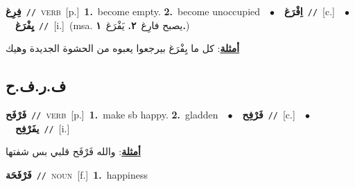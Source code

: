 \documentclass[10pt,a4paper,twoside]{article} %
\begin{document}
\begin{multicols}{2}
{\setlength\topsep{0pt}\textbf{\foreignlanguage{arabic}{فِرِغ}}\ {\color{gray}\texttt{//}\color{black}}\ \textsc{verb}\ [p.]\ \textbf{1.}~become empty.  \textbf{2.}~become unoccupied\ \ $\bullet$\ \ \setlength\topsep{0pt}\textbf{\foreignlanguage{arabic}{اِفْرَغ}}\ {\color{gray}\texttt{//}\color{black}}\ [c.]\ \ $\bullet$\ \ \setlength\topsep{0pt}\textbf{\foreignlanguage{arabic}{يِفْرَغ}}\ {\color{gray}\texttt{//}\color{black}}\ [i.]\ \color{gray}(msa. \foreignlanguage{arabic}{يصبح فارِغ}~\foreignlanguage{arabic}{\textbf{٢.}}  \foreignlanguage{arabic}{يَفْرَغ}~\foreignlanguage{arabic}{\textbf{١.}})\color{black}\  \begin{flushright}\color{gray}\foreignlanguage{arabic}{\textbf{\underline{\foreignlanguage{arabic}{أمثلة}}}: كل ما يِفْرَغ بيرجعوا يعبوه من الحشوة الجديدة وهيك}\end{flushright}\color{black}} \vspace{2mm}

\vspace{-3mm}
\subsection*{\color{blue}\foreignlanguage{arabic}{ف.ر.ف.ح}\color{blue}{}} 

{\setlength\topsep{0pt}\textbf{\foreignlanguage{arabic}{فَرْفَح}}\ {\color{gray}\texttt{//}\color{black}}\ \textsc{verb}\ [p.]\ \textbf{1.}~make sb happy.  \textbf{2.}~gladden\ \ $\bullet$\ \ \setlength\topsep{0pt}\textbf{\foreignlanguage{arabic}{فَرْفِح}}\ {\color{gray}\texttt{//}\color{black}}\ [c.]\ \ $\bullet$\ \ \setlength\topsep{0pt}\textbf{\foreignlanguage{arabic}{يفَرْفِح}}\ {\color{gray}\texttt{//}\color{black}}\ [i.]\  \begin{flushright}\color{gray}\foreignlanguage{arabic}{\textbf{\underline{\foreignlanguage{arabic}{أمثلة}}}: والله فَرْفَح قلبي بس شفتها}\end{flushright}\color{black}} \vspace{2mm}

{\setlength\topsep{0pt}\textbf{\foreignlanguage{arabic}{فَرْفَحَة}}\ {\color{gray}\texttt{//}\color{black}}\ \textsc{noun}\ [f.]\ \textbf{1.}~happiness\ } \vspace{2mm}


\end{multicols}
\end{document}

